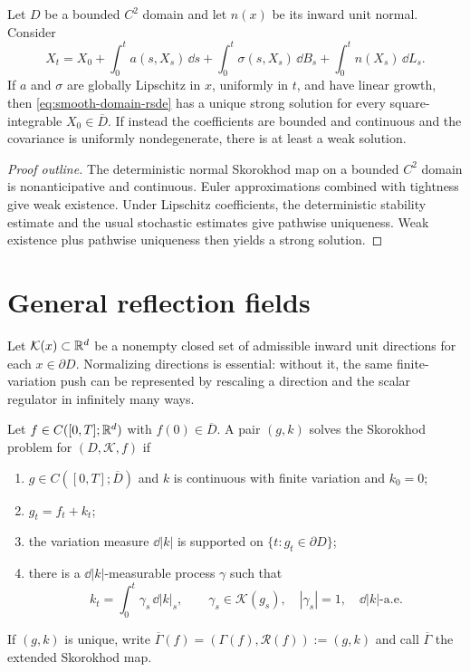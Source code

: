 \begin{theorem}
Let $D$ be a bounded $C^2$ domain and let $n(x)$ be its inward unit normal.
Consider
\begin{equation}
  X_t=X_0+\int_0^t a(s,X_s)\,\dd s
      +\int_0^t\sigma(s,X_s)\,\dd B_s
      +\int_0^t n(X_s)\,\dd L_s. \label{eq:smooth-domain-rsde}
\end{equation}
If $a$ and $\sigma$ are globally Lipschitz in $x$, uniformly in $t$, and have
linear growth, then \eqref{eq:smooth-domain-rsde} has a unique strong solution
for every square-integrable $X_0\in\overline D$. If instead the coefficients
are bounded and continuous and the covariance is uniformly nondegenerate,
there is at least a weak solution.
\end{theorem}

\begin{proof}[Proof outline]
The deterministic normal Skorokhod map on a bounded $C^2$ domain is
nonanticipative and continuous. Euler approximations combined with tightness
give weak existence. Under Lipschitz coefficients, the deterministic
stability estimate and the usual stochastic estimates give pathwise
uniqueness. Weak existence plus pathwise uniqueness then yields a strong
solution.
\end{proof}

\section{General reflection fields}

Let $\mathcal K(x)\subset\mathbb R^d$ be a nonempty closed set of admissible inward unit
directions for each $x\in\partial D$. Normalizing directions is essential:
without it, the same finite-variation push can be represented by rescaling a
direction and the scalar regulator in infinitely many ways.

\begin{definition}
Let $f\in C([0,T];\mathbb R^d)$ with $f(0)\in\overline D$. A pair $(g,k)$ solves the
Skorokhod problem for $(D,\mathcal K,f)$ if
\begin{enumerate}[label=(\roman*)]
  \item $g\in C([0,T];\overline D)$ and $k$ is continuous with finite
        variation and $k_0=0$;
  \item $g_t=f_t+k_t$;
  \item the variation measure $\dd|k|$ is supported on
        $\{t:g_t\in\partial D\}$;
  \item there is a $\dd|k|$-measurable process $\gamma$ such that
  \[
    k_t=\int_0^t\gamma_s\,\dd|k|_s,
    \qquad
    \gamma_s\in\mathcal K(g_s),\quad |\gamma_s|=1,
    \quad\dd|k|\text{-a.e.}
  \]
\end{enumerate}
If $(g,k)$ is unique, write
$\overline\Gamma(f)=(\Gamma(f),\mathcal R(f)):=(g,k)$ and call
$\overline\Gamma$ the extended Skorokhod map.
\end{definition}

